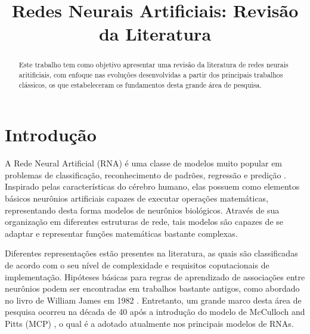 \documentclass[conference]{IEEEtran}
\begin{document}
	
	\title{Redes Neurais Artificiais: Revisão da Literatura}
	
	
	\author{
		}
	
	
	
	\maketitle
	
	\begin{abstract}
		Este trabalho tem como objetivo apresentar uma revisão da literatura de redes neurais aritificiais, com enfoque nas evoluções desenvolvidas a partir dos principais trabalhos clássicos, os que estabeleceram os fundamentos desta grande área de pesquisa. 
	\end{abstract}

	\section{Introdução}
	A Rede Neural Artificial (RNA) é uma classe de modelos muito popular em problemas de classificação, reconhecimento de padrões, regressão e predição \cite{jain1996artificial}. Inspirado pelas características do cérebro humano, elas possuem como elementos básicos neurônios artificiais capazes de executar operações matemáticas, representando desta forma modelos de neurônios biológicos. Através de sua organização em diferentes estruturas de rede, tais modelos são capazes de se adaptar e representar funções matemáticas bastante complexas. 
	
	Diferentes representações estão presentes na literatura, as quais são classificadas de acordo com o seu nível de complexidade e requisitos coputacionais de implementação. Hipóteses básicas para regras de aprendizado de associações entre neurônios podem ser encontradas em trabalhos bastante antigos, como abordado no livro de William James em 1982 \cite{james1984psychology}. Entretanto, um grande marco desta área de pesquisa ocorreu na década de 40 após a introdução do modelo de McCulloch and Pitts (MCP) \cite{mcculloch1943logical}, o qual é a adotado atualmente nos principais modelos de RNAs.
	
\end{document}

